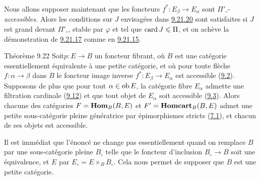 \documentclass[10pt]{../fichiers-configuration-latex/smfart}
\begin{document}
\subsubsection{}
Nous allons supposer maintenant que les foncteurs
$f^\ast:E_{\beta}\rightarrow E_{\alpha}$ sont
$\Pi'_{\circ}$-\emph{accessibles.} Alors les conditions sur $J$
envisagées dans \hyperref[I.sec9.21.20]{9.21.20} sont satisfaites si $J$ est grand devant
$\Pi'_{\circ}$, stable par $\varphi$ et tel que $\operatorname{card} J\leqslant \Pi$,
et on achève la démonstration de \hyperref[I.lem9.21.17]{9.21.17} comme en
\hyperref[I.sec9.21.15]{9.21.15}.

\begin{enonce*}{Théorème 9.22}
Soit\pageoriginale $p:E\rightarrow B$ un foncteur fibrant, où $B$
est une catégorie essentiellement équivalente à une petite
catégorie, et où pour toute flèche $f:\alpha\rightarrow \beta$ dans
$B$ le foncteur image inverse $f^\ast:E_{\beta}\rightarrow
E_{\alpha}$ est accessible (\hyperref[I.def9.2]{9.2}). Supposons de plus que pour tout
$\alpha\in \operatorname{ob} E$, la catégorie fibre $E_{\alpha}$ admette une
filtration cardinale (\hyperref[I.def9.12]{9.12}) et que tout objet de $E_{\alpha}$ soit
accessible (\hyperref[I.def9.3]{9.3}). Alors chacune des catégories
$F=\operatorname{\mathbf{Hom}}_B(B,E)$ et
$F'=\operatorname{\mathbf{Homcart}}_B(B,E)$ admet une petite sous-catégorie pleine
génératrice par épimorphismes stricts (\hyperref[I.def7.1]{7.1}), et
chacun de ses objets est accessible.
\end{enonce*}

Il est immédiat que l'énoncé ne change pas essentiellement quand on
remplace $B$ par une sous-catégorie pleine $B_{\circ}$ telle que le
foncteur d'inclusion $B_{\circ}\rightarrow B$ soit une équivalence,
et $E$ par $E_{\circ}=E\times_B B_{\circ}$. Cela nous permet de
supposer que $B$ est une petite catégorie.
\end{document}
